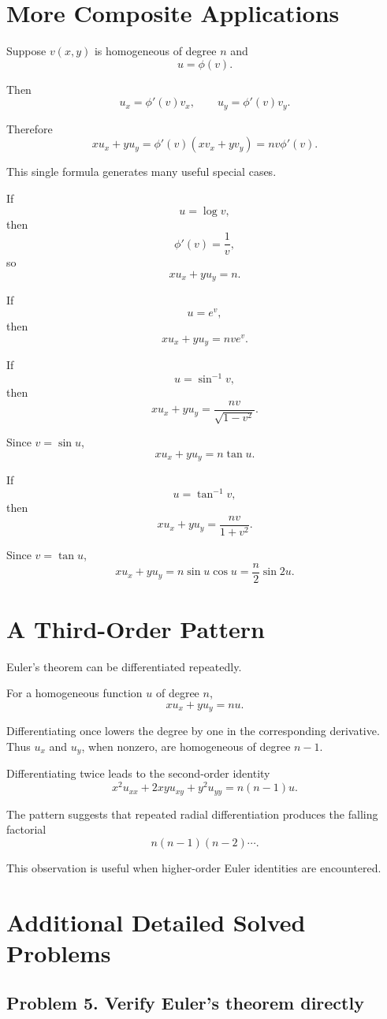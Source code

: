 \documentclass[11pt,oneside]{book}
\theoremstyle{studentthm}
\theoremstyle{definition}
\begin{document}
\section{More Composite Applications}

Suppose \(v(x,y)\) is homogeneous of degree \(n\) and
\[
u=\phi(v).
\]

Then
\[
u_x=\phi'(v)v_x,
\qquad
u_y=\phi'(v)v_y.
\]

Therefore
\[
xu_x+yu_y
=
\phi'(v)(xv_x+yv_y)
=
nv\phi'(v).
\]

This single formula generates many useful special cases.

If
\[
u=\log v,
\]
then
\[
\phi'(v)=\frac1v,
\]
so
\[
xu_x+yu_y=n.
\]

If
\[
u=e^v,
\]
then
\[
xu_x+yu_y=nve^v.
\]

If
\[
u=\sin^{-1}v,
\]
then
\[
xu_x+yu_y
=
\frac{nv}{\sqrt{1-v^2}}.
\]

Since \(v=\sin u\),
\[
xu_x+yu_y
=
n\tan u.
\]

If
\[
u=\tan^{-1}v,
\]
then
\[
xu_x+yu_y
=
\frac{nv}{1+v^2}.
\]

Since \(v=\tan u\),
\[
xu_x+yu_y
=
n\sin u\cos u
=
\frac n2\sin2u.
\]

\section{A Third-Order Pattern}

Euler's theorem can be differentiated repeatedly.

For a homogeneous function \(u\) of degree \(n\),
\[
xu_x+yu_y=nu.
\]

Differentiating once lowers the degree by one in the corresponding
derivative. Thus \(u_x\) and \(u_y\), when nonzero, are homogeneous of
degree \(n-1\).

Differentiating twice leads to the second-order identity
\[
x^2u_{xx}
+
2xyu_{xy}
+
y^2u_{yy}
=
n(n-1)u.
\]

The pattern suggests that repeated radial differentiation produces the
falling factorial
\[
n(n-1)(n-2)\cdots.
\]

This observation is useful when higher-order Euler identities are
encountered.

\section{Additional Detailed Solved Problems}

\subsection*{Problem 5. Verify Euler's theorem directly}
\end{document}
